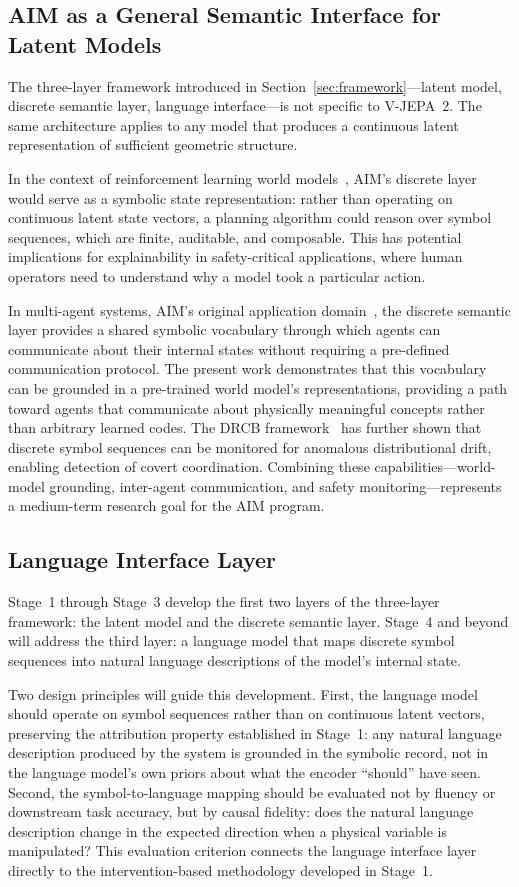 \documentclass{article}
\begin{document}
\subsection{AIM as a General Semantic Interface for Latent Models}

The three-layer framework introduced in
Section~\ref{sec:framework}---latent model, discrete semantic layer,
language interface---is not specific to V-JEPA~2.
The same architecture applies to any model that produces a continuous
latent representation of sufficient geometric structure.

In the context of reinforcement learning world
models~\cite{lecun2022path}, AIM's discrete layer would serve as a
symbolic state representation: rather than operating on continuous
latent state vectors, a planning algorithm could reason over symbol
sequences, which are finite, auditable, and composable.
This has potential implications for explainability in safety-critical
applications, where human operators need to understand why a model
took a particular action.

In multi-agent systems, AIM's original application
domain~\cite{liu2025aim}, the discrete semantic layer provides a
shared symbolic vocabulary through which agents can communicate about
their internal states without requiring a pre-defined communication
protocol.
The present work demonstrates that this vocabulary can be grounded in
a pre-trained world model's representations, providing a path toward
agents that communicate about physically meaningful concepts rather
than arbitrary learned codes.
The DRCB framework~\cite{liu2026drcb} has further shown that
discrete symbol sequences can be monitored for anomalous distributional
drift, enabling detection of covert coordination.
Combining these capabilities---world-model grounding, inter-agent
communication, and safety monitoring---represents a medium-term
research goal for the AIM program.

\subsection{Language Interface Layer}

Stage~1 through Stage~3 develop the first two layers of the
three-layer framework: the latent model and the discrete semantic
layer.
Stage~4 and beyond will address the third layer: a language model
that maps discrete symbol sequences into natural language descriptions
of the model's internal state.

Two design principles will guide this development.
First, the language model should operate on symbol sequences rather
than on continuous latent vectors, preserving the attribution property
established in Stage~1: any natural language description produced by
the system is grounded in the symbolic record, not in the language
model's own priors about what the encoder ``should'' have seen.
Second, the symbol-to-language mapping should be evaluated not by
fluency or downstream task accuracy, but by causal fidelity: does
the natural language description change in the expected direction when
a physical variable is manipulated?
This evaluation criterion connects the language interface layer
directly to the intervention-based methodology developed in Stage~1.
\end{document}

